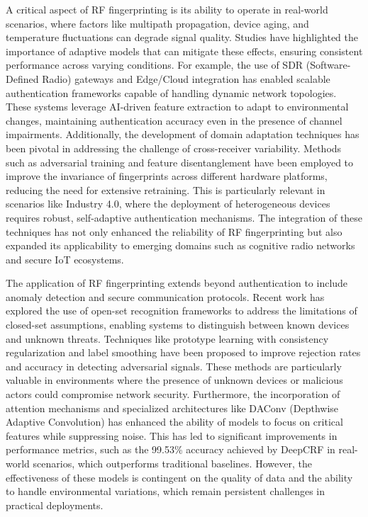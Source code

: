 \documentclass[conference]{IEEEtran}
\begin{document}
A critical aspect of RF fingerprinting is its ability to operate in real-world scenarios, where factors like multipath propagation, device aging, and temperature fluctuations can degrade signal quality. Studies have highlighted the importance of adaptive models that can mitigate these effects, ensuring consistent performance across varying conditions. For example, the use of SDR (Software-Defined Radio) gateways and Edge/Cloud integration has enabled scalable authentication frameworks capable of handling dynamic network topologies. These systems leverage AI-driven feature extraction to adapt to environmental changes, maintaining authentication accuracy even in the presence of channel impairments. Additionally, the development of domain adaptation techniques has been pivotal in addressing the challenge of cross-receiver variability. Methods such as adversarial training and feature disentanglement have been employed to improve the invariance of fingerprints across different hardware platforms, reducing the need for extensive retraining. This is particularly relevant in scenarios like Industry 4.0, where the deployment of heterogeneous devices requires robust, self-adaptive authentication mechanisms. The integration of these techniques has not only enhanced the reliability of RF fingerprinting but also expanded its applicability to emerging domains such as cognitive radio networks and secure IoT ecosystems.  

The application of RF fingerprinting extends beyond authentication to include anomaly detection and secure communication protocols. Recent work has explored the use of open-set recognition frameworks to address the limitations of closed-set assumptions, enabling systems to distinguish between known devices and unknown threats. Techniques like prototype learning with consistency regularization and label smoothing have been proposed to improve rejection rates and accuracy in detecting adversarial signals. These methods are particularly valuable in environments where the presence of unknown devices or malicious actors could compromise network security. Furthermore, the incorporation of attention mechanisms and specialized architectures like DAConv (Depthwise Adaptive Convolution) has enhanced the ability of models to focus on critical features while suppressing noise. This has led to significant improvements in performance metrics, such as the 99.53\% accuracy achieved by DeepCRF in real-world scenarios, which outperforms traditional baselines. However, the effectiveness of these models is contingent on the quality of data and the ability to handle environmental variations, which remain persistent challenges in practical deployments.  
\end{document}
